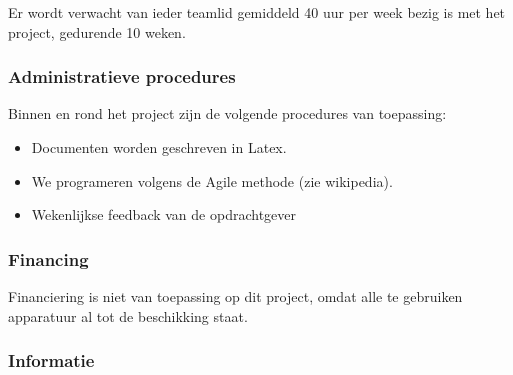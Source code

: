 Er wordt verwacht van ieder teamlid gemiddeld 40 uur per week bezig is met het project, gedurende 10 weken.

\subsubsection{Administratieve procedures}

Binnen en rond het project zijn de volgende procedures van toepassing:

\begin{itemize}
    \item Documenten worden geschreven in Latex.
    \item We programeren volgens de Agile methode (zie wikipedia).
    \item Wekenlijkse feedback van de opdrachtgever
\end{itemize}

\subsubsection{Financing}

Financiering is niet van toepassing op dit project, omdat alle te gebruiken apparatuur al tot de beschikking staat.

\subsubsection{Informatie}






